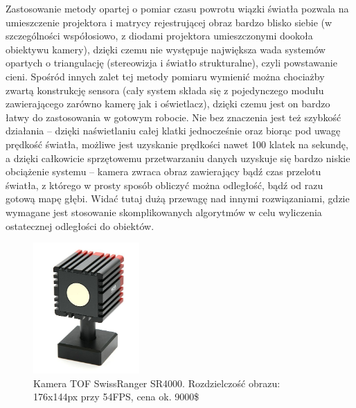 Zastosowanie metody opartej o pomiar czasu powrotu wiązki światła pozwala na
umieszczenie projektora i matrycy rejestrującej obraz bardzo blisko siebie (w
szczególności współosiowo, z diodami projektora umieszczonymi dookoła obiektywu
kamery), dzięki czemu nie występuje największa wada systemów opartych o
triangulację (stereowizja i światło strukturalne), czyli powstawanie cieni.
Spośród innych zalet tej metody pomiaru wymienić można chociażby zwartą
konstrukcję sensora (cały system składa się z pojedynczego modułu zawierającego
zarówno kamerę jak i oświetlacz), dzięki czemu jest on bardzo łatwy do
zastosowania w gotowym robocie. Nie bez znaczenia jest też szybkość działania --
dzięki naświetlaniu całej klatki jednocześnie oraz biorąc pod uwagę prędkość 
światła, możliwe jest uzyskanie prędkości nawet 100 klatek na sekundę, a dzięki
całkowicie sprzętowemu przetwarzaniu danych uzyskuje się bardzo niskie
obciążenie systemu -- kamera zwraca obraz zawierający bądź czas przelotu
światła, z którego w prosty sposób obliczyć można odległość, bądź od razu gotową
mapę głębi. Widać tutaj dużą przewagę nad innymi rozwiązaniami, gdzie wymagane
jest stosowanie skomplikowanych algorytmów w celu wyliczenia ostatecznej
odległości do obiektów.

\begin{figure}[h!]
\centering
\includegraphics[height=5cm]{../../Common/img/sr4000} 
\caption[Kamera TOF SwissRanger SR4000]{Kamera TOF SwissRanger SR4000.
Rozdzielczość obrazu: 176x144px przy 54FPS, cena ok. 9000\$}
\label{fig:sr4000}
\end{figure}
 
